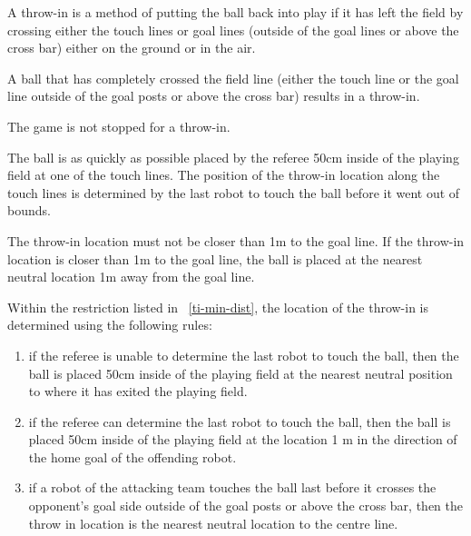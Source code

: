 \documentclass[12pt]{hurocup}
\begin{document}
\label{us-throw-in}

A throw-in is a method of putting the ball back into play if it has
left the field by crossing either the touch lines or goal lines
(outside of the goal lines or above the cross bar) either on the
ground or in the air.

\begin{lawlist}[US]

\item A ball that has completely crossed the field line (either the
  touch line or the goal line outside of the goal posts or above the
  cross bar) results in a throw-in.

\item The game is not stopped for a throw-in.

\item The ball is as quickly as possible placed by the referee 50cm
  inside of the playing field at one of the touch lines. The position
  of the throw-in location along the touch lines is determined by the
  last robot to touch the ball before it went out of bounds.

\item \label{ti-min-dist} The throw-in location must not be closer
  than 1m to the goal line. If the throw-in location is closer than 1m
  to the goal line, the ball is placed at the nearest neutral location
  1m away from the goal line.

\item Within the restriction listed in ~\ref{ti-min-dist}, the
  location of the throw-in is determined using the following rules:
  \begin{enumerate}
    \item if the referee is unable to determine the last robot to
      touch the ball, then the ball is placed 50cm inside of the
      playing field at the nearest neutral position to where it has
      exited the playing field.
    \item if the referee can determine the last robot to touch the
      ball, then the ball is placed 50cm inside of the playing field
      at the location 1 m in the direction of the home goal of the
      offending robot.
    \item if a robot of the attacking team touches the ball last
      before it crosses the opponent's goal side outside of the goal
      posts or above the cross bar, then the throw in location is the
      nearest neutral location to the centre line.
  \end{enumerate}

\end{lawlist}
\end{document}

